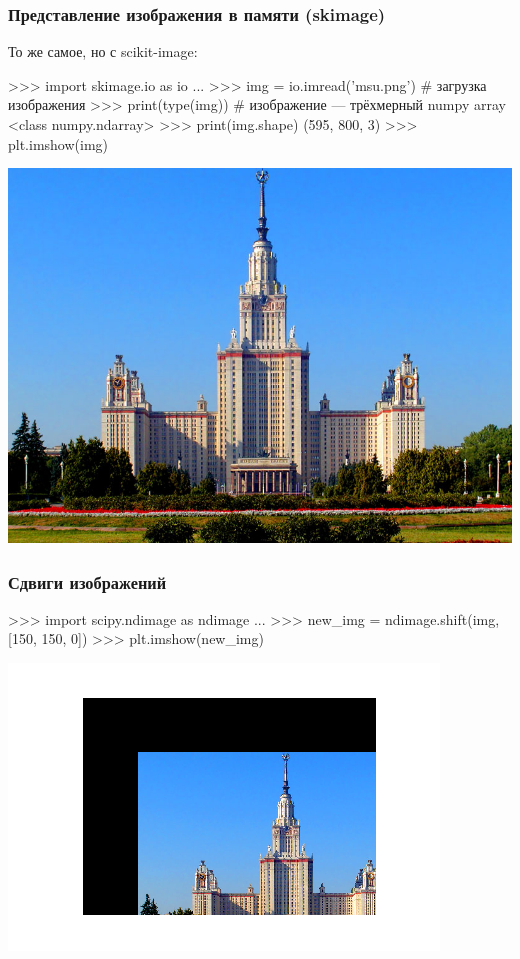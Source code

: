 \documentclass[fleqn, xcolor=x11names]{beamer}
\begin{document}
\begin{frame}[fragile]\frametitle{Представление изображения в памяти (skimage)}
То же самое, но с scikit-image:
\begin{pcode}
>>> import skimage.io as io
...
>>> img = io.imread('msu.png') # загрузка изображения
>>> print(type(img))  # изображение — трёхмерный numpy array
<class numpy.ndarray>
>>> print(img.shape)
(595, 800, 3)
>>> plt.imshow(img)
\end{pcode}

\includegraphics[scale=0.3]{images/msu.png}
\end{frame}

\begin{frame}[fragile]\frametitle{Сдвиги изображений}
\begin{pcode}
>>> import scipy.ndimage as ndimage
...
>>> new_img = ndimage.shift(img, [150, 150, 0])
>>> plt.imshow(new_img)
\end{pcode}
\includegraphics[scale=0.45]{images/img_shift.png}

\end{frame}
\end{document}
